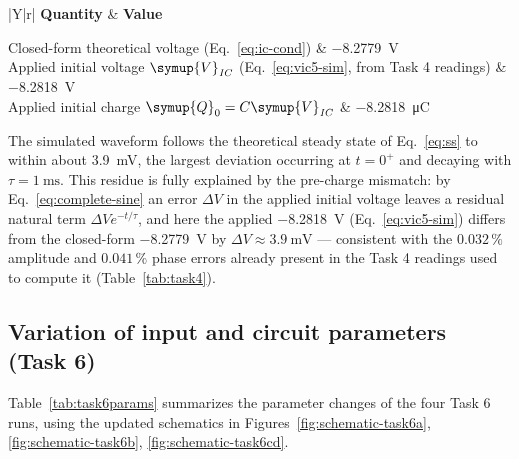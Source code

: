 \documentclass[12pt,a4paper]{article}
\newcommand{\reporttablestyle}{%
	\small
	\renewcommand{\arraystretch}{1.25}%
	\setlength{\tabcolsep}{6pt}%
	\setlength{\arrayrulewidth}{0.4pt}%
	\arrayrulecolor{black!65}}
\begin{document}
	\begin{table}[H]
		\centering
		\caption{Task 5: initial capacitor charge applied to eliminate the
			transient ($C = \SI{1}{\micro\farad}$)}
		\label{tab:task5}
		\reporttablestyle
		\begin{tabularx}{\linewidth}{|Y|r|}
			\hline
			\textbf{Quantity} & \textbf{Value} \\ \hline
			
			Closed-form theoretical voltage (Eq.~\eqref{eq:ic-cond}) & \SI{-8.2779}{\volt} \\ \hline
			Applied initial voltage $\symup{V}_{\mathit{IC}}$ (Eq.~\eqref{eq:vic5-sim}, from Task 4 readings) & \SI{-8.2818}{\volt} \\ \hline
			Applied initial charge $\symup{Q}_{0} = C \symup{V}_{\mathit{IC}}$ & \SI{-8.2818}{\micro\coulomb} \\ \hline
			
		\end{tabularx}
	\end{table}
	
	The simulated waveform follows the theoretical steady state of
	Eq.~\eqref{eq:ss} to within about \SI{3.9}{\milli\volt}, the
	largest deviation occurring at $t = 0^{+}$ and decaying with
	$\tau = \SI{1}{\milli\second}$.  This residue is fully explained by
	the pre-charge mismatch: by Eq.~\eqref{eq:complete-sine} an error
	$\Delta V$ in the applied initial voltage leaves a residual natural
	term $\Delta V e^{-t/\tau}$, and here the applied
	\SI{-8.2818}{\volt} (Eq.~\eqref{eq:vic5-sim}) differs from the
	closed-form \SI{-8.2779}{\volt} by $\Delta V \approx
	\SI{3.9}{\milli\volt}$ --- consistent with the $0.032\,\%$
	amplitude and $0.041\,\%$ phase errors already present in the
	Task 4 readings used to compute it (Table~\ref{tab:task4}).
	
	\subsection{Variation of input and circuit parameters (Task 6)}
	
	Table~\ref{tab:task6params} summarizes the parameter changes of the
	four Task 6 runs, using the updated schematics in
	Figures~\ref{fig:schematic-task6a}, \ref{fig:schematic-task6b},
	\ref{fig:schematic-task6cd}.
	
\end{document}
